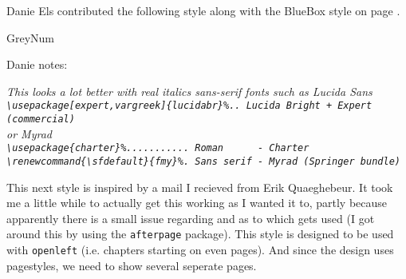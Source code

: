 Danie Els contributed the following style along with the BlueBox style
on page \pageref{BlueBox}.
\begin{showchapterstyle}{GreyNum}
\usepackage{fix-cm}
\usepackage{fourier}%
\usepackage[scaled=.92]{helvet}%
\usepackage[T1]{fontenc}
\usepackage{color}
\newcommand{\LargeFont}{%
      \usefont{\encodingdefault}{\rmdefault}{b}{n}%
      \fontsize{60}{80}\selectfont\color{ChapGrey}}
\makeatletter
\makechapterstyle{GreyNum}{%
  \renewcommand{\chapnamefont}{\large\sffamily\bfseries\itshape}
  \renewcommand{\chapnumfont}{\LargeFont}
  \renewcommand{\chaptitlefont}{\Huge\sffamily\bfseries\itshape}
  \setlength{\beforechapskip}{0pt}
  \setlength{\midchapskip}{40pt}
  \setlength{\afterchapskip}{60pt}
  \renewcommand\chapterheadstart{\vspace*{\beforechapskip}}
  \renewcommand\printchaptername{%
    \begin{tabular}{@{}c@{}}
      \chapnamefont \@chapapp\\}
    \renewcommand\chapternamenum{\noalign{\vskip 2ex}}
    \renewcommand\printchapternum{\chapnumfont\thechapter\par}
    \renewcommand\afterchapternum{%
    \end{tabular}
    \par\nobreak\vskip\midchapskip}
  \renewcommand\printchapternonum{}
  \renewcommand\printchaptertitle[1]{%
    {\chaptitlefont{##1}\par}}
  \renewcommand\afterchaptertitle{\par\nobreak\vskip \afterchapskip}
}
\makeatother
\end{showchapterstyle}
Danie notes:
\begin{adjustwidth}{1em}{0pt}
  \itshape
  This looks a lot better with real italics sans-serif
  fonts such as Lucida Sans\\
  \verb|\usepackage[expert,vargreek]{lucidabr}%.. Lucida Bright + Expert (commercial)|
  \\
  or Myrad\\
  \verb|\usepackage{charter}%........... Roman      - Charter|\\
  \verb|\renewcommand{\sfdefault}{fmy}%. Sans serif - Myrad (Springer bundle)|
\end{adjustwidth}

\starbreak


This next style is inspired by a mail I recieved from Erik
Quaeghebeur. It took me a little while to actually get this working as
I wanted it to, partly because apparently there is a small issue
regarding  and  as to which
 gets used (I got around this by using the
\texttt{afterpage} package). This style is designed to be used with
\texttt{openleft} (i.e. chapters starting on even pages). And since
the design uses pagestyles, we need to show several seperate pages.


